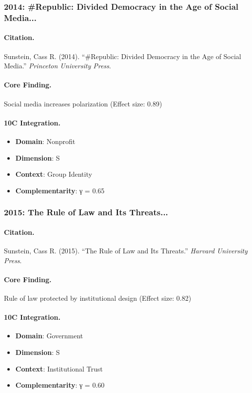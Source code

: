 \subsubsection{2014: #Republic: Divided Democracy in the Age of Social Media...}

\paragraph{Citation.}
Sunstein, Cass R. (2014). ``#Republic: Divided Democracy in the Age of Social Media.''
\textit{Princeton University Press}.

\paragraph{Core Finding.}
Social media increases polarization (Effect size: 0.89)

\paragraph{10C Integration.}
\begin{itemize}[nosep]
  \item \textbf{Domain}: Nonprofit
  \item \textbf{Dimension}: S
  \item \textbf{Context}: Group Identity
  \item \textbf{Complementarity}: γ = 0.65
\end{itemize}

\subsubsection{2015: The Rule of Law and Its Threats...}

\paragraph{Citation.}
Sunstein, Cass R. (2015). ``The Rule of Law and Its Threats.''
\textit{Harvard University Press}.

\paragraph{Core Finding.}
Rule of law protected by institutional design (Effect size: 0.82)

\paragraph{10C Integration.}
\begin{itemize}[nosep]
  \item \textbf{Domain}: Government
  \item \textbf{Dimension}: S
  \item \textbf{Context}: Institutional Trust
  \item \textbf{Complementarity}: γ = 0.60
\end{itemize}

